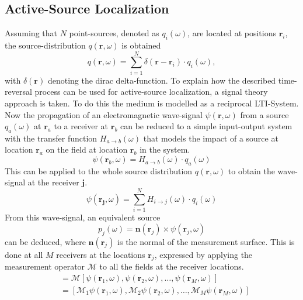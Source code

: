 \subsection{Active-Source Localization}
Assuming that \(N\) point-sources, denoted as \(q_i(\omega)\), are located at positions \(\bm{r}_i\), the source-distribution \(q(\bm{r}, \omega)\) is obtained
\begin{equation}
    q(\bm{r}, \omega) = \sum_{i=1}^{N} \delta(\bm{r} - \bm{r}_i) \cdot q_i(\omega),
\end{equation}
with \(\delta(\bm{r}) \) denoting the dirac delta-function.
To explain how the described time-reversal process can be used for active-source localization, a signal theory approach is taken.
To do this the medium is modelled as a reciprocal LTI-System.
Now the propagation of an electromagnetic wave-signal \(\psi(\bm{r}, \omega )\) from a source \(q_a(\omega )\) at \(\bm{r}_a\) to a receiver at \(\bm{r}_b\) can be reduced to a simple input-output system with the transfer function \(H_{a\rightarrow b}(\omega)\) that models the impact of a source at location \(\bm{r}_a\) on the field at location \(\bm{r}_b\) in the system.
\begin{equation}
    \psi(\bm{r}_b, \omega) = H_{a\rightarrow b}(\omega) \cdot q_a(\omega)
\end{equation}
This can be applied to the whole source distribution \(q(\bm{r}, \omega)\) to obtain the wave-signal at the receiver \(\bm{j}\).
\begin{equation}
    \psi(\bm{r_j}, \omega) = \sum_{i=1}^{N} H_{i\rightarrow j}(\omega) \cdot q_i(\omega)
\end{equation}
From this wave-signal, an equivalent source 
\begin{equation}
    p_j(\omega) = \bm{n}(\bm{r}_j) \times \psi(\bm{r}_j, \omega)
\end{equation}
can be deduced, where \(\bm{n}(\bm{r}_j)\) is the normal of the measurement surface. 
This is done at all \(M\) receivers at the locations \(\bm{r}_j\), expressed by applying the measurement operator \(\mathcal{M}\) to all the fields at the receiver locations.  
\begin{align}
    [p_1(\omega), p_2(\omega), \ldots, p_M(\omega)] &= \mathcal{M} [\psi(\bm{r}_1, \omega), \psi(\bm{r}_2, \omega), \ldots, \psi(\bm{r}_M, \omega)] \\
                                                    &= [\mathcal{M}_1 \psi(\bm{r}_1, \omega), \mathcal{M}_2 \psi(\bm{r}_2, \omega), \ldots, \mathcal{M}_M \psi(\bm{r}_M, \omega)]
\end{align}
